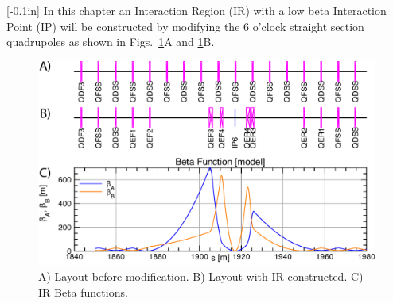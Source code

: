 \documentclass{hitec}     %
\begin{document}
{[-0.1in]
%
In this chapter an Interaction Region (IR) with a low beta
Interaction Point (IP)  will be constructed by modifying the 6 o'clock straight section quadrupoles
as shown in Figs.~\ref{f:sstoir}A and \ref{f:sstoir}B. 
\begin{figure}[bt]
   \centering
  \includegraphics[width=0.9\linewidth]{figures/ip6-layout.pdf}
  \caption{A) Layout before modification. B) Layout with IR constructed. C) IR Beta functions.}
  \label{f:sstoir}
\end{figure}

}
\end{document}
